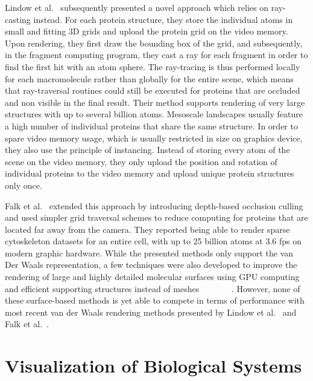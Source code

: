 Lindow et al.~\cite{lindow2012interactive} subsequently presented a novel approach which relies on ray-casting instead.
For each protein structure, they store the individual atoms in small and fitting 3D grids and upload the protein grid on the video memory.
Upon rendering, they first draw the bounding box of the grid, and subsequently, in the fragment computing program, they cast a ray for each fragment in order to find the first hit with an atom sphere.
The ray-tracing is thus performed locally for each macromolecule rather than globally for the entire scene, which means that ray-traversal routines could still be executed for proteins that are occluded and non visible in the final result.
Their method supports rendering of very large structures with up to several billion atoms.
Mesoscale landscapes usually feature a high number of individual proteins that share the same structure.
In order to spare video memory usage, which is usually restricted in size on graphics device, they also use the principle of instancing.
Instead of storing every atom of the scene on the video memory, they only upload the position and rotation of individual proteins to the video memory and upload unique protein structures only once.

Falk et al.~\cite{falk2013atomistic} extended this approach by introducing depth-based occlusion culling and used simpler grid traversal schemes to reduce computing for proteins that are located far away from the camera.
They reported being able to render sparse cytoskeleton datasets for an entire cell, with up to 25 billion atoms at 3.6 fps on modern graphic hardware.
While the presented methods only support the van Der Waals representation, a few techniques were also developed to improve the rendering of large and highly detailed molecular surfaces using GPU computing and efficient supporting structures instead of meshes ~\cite{krone2012fast}~\cite{parulek2012implicit} ~\cite{parulek2013fast} ~\cite{krone2011parallel} ~\cite{szecsi2012real}. 
However, none of these surface-based methods is yet able to compete in terms of performance with most recent van der Waals rendering methods presented by Lindow et al.~\cite{lindow2012interactive} and Falk et al.~\cite{falk2013atomistic}.


\section{Visualization of Biological Systems}

